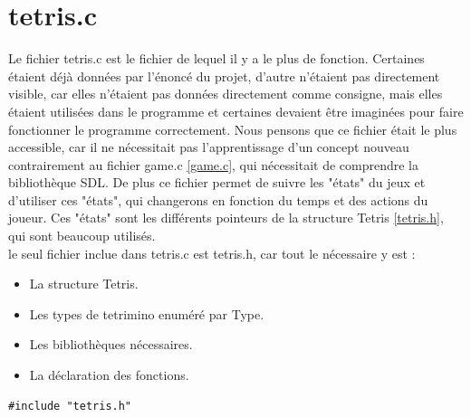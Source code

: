 \documentclass[a4paper,10p]{report}
\begin{document}
\section{tetris.c}
\label{tetris.c}
Le fichier tetris.c est le fichier de lequel il y a le plus de fonction. Certaines étaient déjà données par l’énoncé du projet, d'autre n'étaient pas directement visible, car elles n'étaient pas données directement comme consigne, mais elles étaient utilisées dans le programme et certaines devaient être imaginées pour faire fonctionner le programme correctement. Nous pensons que ce fichier était le plus accessible, car il ne nécessitait pas l'apprentissage d'un concept nouveau contrairement au fichier game.c \ref{game.c}, qui nécessitait de comprendre la bibliothèque SDL. De plus ce fichier permet de suivre les "états" du jeux et d'utiliser ces "états", qui changerons en fonction du temps et des actions du joueur. Ces "états" sont les différents pointeurs de la structure Tetris \ref{tetris.h}, qui sont beaucoup utilisés.
\\ le seul fichier inclue dans tetris.c est tetris.h, car tout le nécessaire y est :
\begin{itemize}
    \item La structure Tetris.
    \item Les types de tetrimino enuméré par Type.
    \item Les bibliothèques nécessaires.
    \item La déclaration des fonctions.
\end{itemize}
\begin{lstlisting}
#include "tetris.h"
\end{lstlisting}
\end{document}
